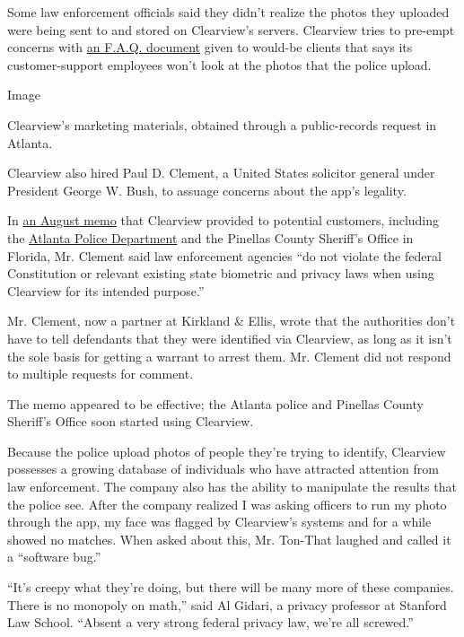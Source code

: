 Some law enforcement officials said they didn't realize the photos they
uploaded were being sent to and stored on Clearview's servers. Clearview
tries to pre-empt concerns with
\href{https://int.graylady3jvrrxbe.onion/data/documenthelper/6690-clearview-faq/c8b081a0bcca12e7903a/optimized/full.pdf\#page=1}{an
F.A.Q. document} given to would-be clients that says its
customer-support employees won't look at the photos that the police
upload.

Image

Clearview's marketing materials, obtained through a public-records
request in Atlanta.

Clearview also hired Paul D. Clement, a United States solicitor general
under President George W. Bush, to assuage concerns about the app's
legality.

In
\href{https://int.graylady3jvrrxbe.onion/data/documenthelper/6689-clearview-legal-memo/c8b081a0bcca12e7903a/optimized/full.pdf\#page=1}{an
August memo} that Clearview provided to potential customers, including
the
\href{https://www.muckrock.com/foi/atlanta-325/facial-recognition-atlanta-ga-76491}{Atlanta
Police Department} and the Pinellas County Sheriff's Office in Florida,
Mr. Clement said law enforcement agencies ``do not violate the federal
Constitution or relevant existing state biometric and privacy laws when
using Clearview for its intended purpose.''

Mr. Clement, now a partner at Kirkland \& Ellis, wrote that the
authorities don't have to tell defendants that they were identified via
Clearview, as long as it isn't the sole basis for getting a warrant to
arrest them. Mr. Clement did not respond to multiple requests for
comment.

The memo appeared to be effective; the Atlanta police and Pinellas
County Sheriff's Office soon started using Clearview.

Because the police upload photos of people they're trying to identify,
Clearview possesses a growing database of individuals who have attracted
attention from law enforcement. The company also has the ability to
manipulate the results that the police see. After the company realized I
was asking officers to run my photo through the app, my face was flagged
by Clearview's systems and for a while showed no matches. When asked
about this, Mr. Ton-That laughed and called it a ``software bug.''

``It's creepy what they're doing, but there will be many more of these
companies. There is no monopoly on math,'' said Al Gidari, a privacy
professor at Stanford Law School. ``Absent a very strong federal privacy
law, we're all screwed.''


